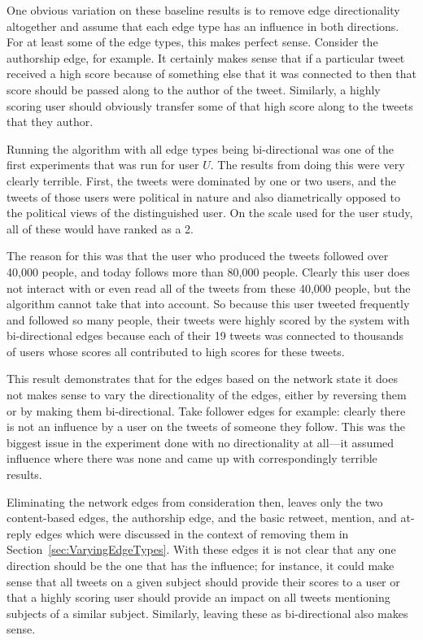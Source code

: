 One obvious variation on these baseline results is to remove edge directionality altogether and assume that each edge type has an influence in both directions. For at least some of the edge types, this makes perfect sense. Consider the authorship edge, for example. It certainly makes sense that if a particular tweet received a high score because of something else that it was connected to then that score should be passed along to the author of the tweet. Similarly, a highly scoring user should obviously transfer some of that high score along to the tweets that they author.

Running the algorithm with all edge types being bi-directional was one of the first experiments that was run for user $U$. The results from doing this were very clearly terrible. First, the tweets were dominated by one or two users, and the tweets of those users were political in nature and also diametrically opposed to the political views of the distinguished user. On the scale used for the user study, all of these would have ranked as a 2.

The reason for this was that the user who produced the tweets followed over 40,000 people, and today follows more than 80,000 people. Clearly this user does not interact with or even read all of the tweets from these 40,000 people, but the algorithm cannot take that into account. So because this user tweeted frequently and followed so many people, their tweets were highly scored by the system with bi-directional edges because each of their 19 tweets was connected to thousands of users whose scores all contributed to high scores for these tweets.

This result demonstrates that for the edges based on the network state it does not makes sense to vary the directionality of the edges, either by reversing them or by making them bi-directional. Take follower edges for example: clearly there is not an influence by a user on the tweets of someone they follow. This was the biggest issue in the experiment done with no directionality at all---it assumed influence where there was none and came up with correspondingly terrible results.

Eliminating the network edges from consideration then, leaves only the two content-based edges, the authorship edge, and the basic retweet, mention, and at-reply edges which were discussed in the context of removing them in Section~\ref{sec:VaryingEdgeTypes}. With these edges it is not clear that any one direction should be the one that has the influence; for instance, it could make sense that all tweets on a given subject should provide their scores to a user or that a highly scoring user should provide an impact on all tweets mentioning subjects of a similar subject. Similarly, leaving these as bi-directional also makes sense.

